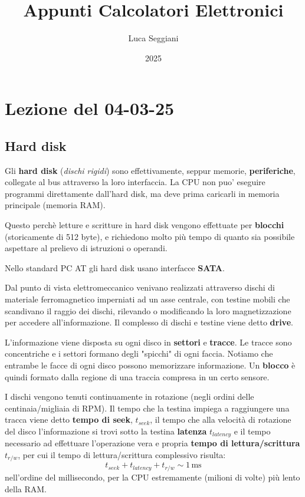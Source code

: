 \documentclass[a4paper,11pt]{article}
\title{Appunti Calcolatori Elettronici}
\author{Luca Seggiani}
\date{2025}
\begin{document}
\section{Lezione del 04-03-25}

\thispagestyle{empty}
\pagestyle{fancy}

\subsection{Hard disk}
Gli \textbf{hard disk} (\textit{dischi rigidi}) sono effettivamente, seppur memorie, \textbf{periferiche}, collegate al bus attraverso la loro interfaccia.
La CPU non puo' eseguire programmi direttamente dall'hard disk, ma deve prima caricarli in memoria principale (memoria RAM).

	Questo perchè letture e scritture in hard disk vengono effettuate per \textbf{blocchi} (storicamente di 512 byte), e richiedono molto più tempo di quanto sia possibile aspettare al prelievo di istruzioni o operandi.

Nello standard PC AT gli hard disk usano interfacce \textbf{SATA}.

Dal punto di vista elettromeccanico venivano realizzati attraverso dischi di materiale ferromagnetico imperniati ad un asse centrale, con testine mobili che scandivano il raggio dei dischi, rilevando o modificando la loro magnetizzazione per accedere all'informazione.
Il complesso di dischi e testine viene detto \textbf{drive}.

L'informazione viene disposta su ogni disco in \textbf{settori} e \textbf{tracce}.
Le tracce sono concentriche e i settori formano degli "spicchi" di ogni faccia.
Notiamo che entrambe le facce di ogni disco possono memorizzare informazione.
Un \textbf{blocco} è quindi formato dalla regione di una traccia compresa in un certo sensore.

I dischi vengono tenuti continuamente in rotazione (negli ordini delle centinaia/migliaia di RPM).
Il tempo che la testina impiega a raggiungere una tracca viene detto \textbf{tempo di seek}, $t_{seek}$, il tempo che alla velocità di rotazione del disco l'informazione si trovi sotto la testina \textbf{latenza} $t_{latency}$ e il tempo necessario ad effettuare l'operazione vera e propria \textbf{tempo di lettura/scrittura} $t_{r/w}$, per cui il tempo di lettura/scrittura complessivo risulta:
$$
t_{seek} + t_{latency} + t_{r/w} \sim 1 \, \mathrm{ms}
$$
nell'ordine del millisecondo, per la CPU estremamente (milioni di volte) più lento della RAM.
\end{document}
